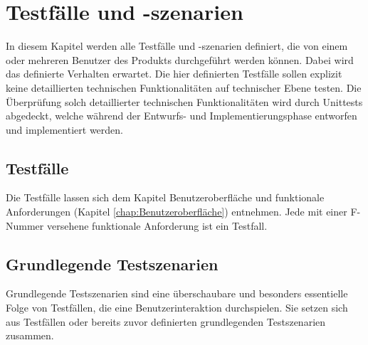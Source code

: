 \documentclass[oneside, ngerman]{sdqtechreport}
\begin{document}
\chapter{Testfälle und -szenarien}
\label{chap:Tests}

In diesem Kapitel werden alle Testfälle und -szenarien definiert, die von einem oder mehreren Benutzer des Produkts durchgeführt werden können. Dabei wird das definierte Verhalten erwartet. Die hier definierten Testfälle sollen explizit keine detaillierten technischen Funktionalitäten auf technischer Ebene testen. Die Überprüfung solch detaillierter technischen Funktionalitäten wird durch Unittests abgedeckt, welche während der Entwurfs- und Implementierungsphase entworfen und implementiert werden.

\section{Testfälle}
\label{sec:Tests:Testfälle}

Die Testfälle lassen sich dem Kapitel Benutzeroberfläche und funktionale Anforderungen (Kapitel \ref{chap:Benutzeroberfläche}) entnehmen. Jede mit einer F-Nummer versehene funktionale Anforderung ist ein Testfall.

\section{Grundlegende Testszenarien}
\label{sec:Tests:GrundlegendeTestszenarien}

Grundlegende Testszenarien sind eine überschaubare und besonders essentielle Folge von Testfällen, die eine Benutzerinteraktion durchspielen. Sie setzen sich aus Testfällen oder bereits zuvor definierten grundlegenden Testszenarien zusammen.
\end{document}
